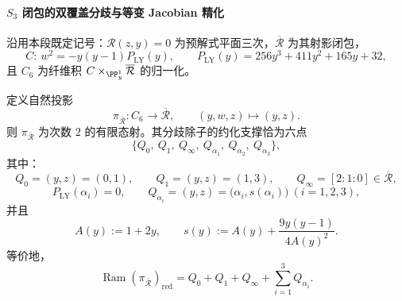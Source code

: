 \paragraph{\texorpdfstring{$S_3$}{S3} 闭包的双覆盖分歧与等变 Jacobian 精化}
沿用本段既定记号：\(\mathscr R(z,y)=0\) 为预解式平面三次，\(\overline{\mathcal R}\) 为其射影闭包，
\[
C:\ w^2=-y(y-1)P_{\mathrm{LY}}(y),\qquad
P_{\mathrm{LY}}(y)=256y^3+411y^2+165y+32,
\]
且 \(C_6\) 为纤维积 \(C\times_{\PP^1_y}\overline{\mathcal R}\) 的归一化。

\begin{theorem}\label{thm:xi-s3-closure-double-cover-explicit-branch-divisor}
定义自然投影
\[
\pi_{\overline{\mathcal R}}:C_6\longrightarrow \overline{\mathcal R},\qquad
(y,w,z)\longmapsto (y,z).
\]
则 \(\pi_{\overline{\mathcal R}}\) 为次数 \(2\) 的有限态射。其分歧除子的约化支撑恰为六点
\[
\bigl\{Q_0,\ Q_1,\ Q_\infty,\ Q_{\alpha_1},\ Q_{\alpha_2},\ Q_{\alpha_3}\bigr\},
\]
其中：
\[
Q_0=(y,z)=(0,1),\qquad
Q_1=(y,z)=(1,3),\qquad
Q_\infty=[2:1:0]\in\overline{\mathcal R},
\]
\[
P_{\mathrm{LY}}(\alpha_i)=0,\qquad
Q_{\alpha_i}=(y,z)=\bigl(\alpha_i,s(\alpha_i)\bigr)\ (i=1,2,3),
\]
并且
\[
A(y):=1+2y,\qquad
s(y):=A(y)+\frac{9y(y-1)}{4A(y)^2}.
\]
等价地，
\[
\operatorname{Ram}(\pi_{\overline{\mathcal R}})_{\mathrm{red}}
=Q_0+Q_1+Q_\infty+\sum_{i=1}^{3}Q_{\alpha_i}.
\]
\end{theorem}

